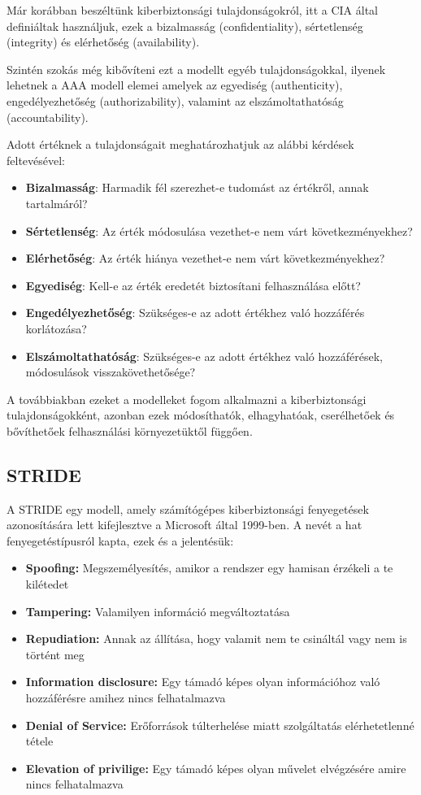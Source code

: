 Már korábban beszéltünk kiberbiztonsági tulajdonságokról, itt a CIA által definiáltak használjuk, ezek a bizalmasság (confidentiality), sértetlenség (integrity) és elérhetőség (availability). 

Szintén szokás még kibővíteni ezt a modellt egyéb tulajdonságokkal, ilyenek lehetnek a AAA modell elemei amelyek az egyediség (authenticity), engedélyezhetőség (authorizability), valamint az elszámoltathatóság (accountability).

Adott értéknek a tulajdonságait meghatározhatjuk az alábbi kérdések feltevésével:
\begin{itemize}
    \item \textbf{Bizalmasság}: Harmadik fél szerezhet-e tudomást az értékről, annak tartalmáról?
    \item \textbf{Sértetlenség}: Az érték módosulása vezethet-e nem várt következményekhez?
    \item \textbf{Elérhetőség}: Az érték hiánya vezethet-e nem várt következményekhez?
    \item \textbf{Egyediség}: Kell-e az érték eredetét biztosítani felhasználása előtt?
    \item \textbf{Engedélyezhetőség}: Szükséges-e az adott értékhez való hozzáférés korlátozása?
    \item \textbf{Elszámoltathatóság}: Szükséges-e az adott értékhez való hozzáférések, módosulások visszakövethetősége?
\end{itemize}

A továbbiakban ezeket a modelleket fogom alkalmazni a kiberbiztonsági tulajdonságokként, azonban ezek módosíthatók, elhagyhatóak, cserélhetőek és bővíthetőek felhasználási környezetüktől függően.

\subsection{STRIDE}
A STRIDE egy modell, amely számítógépes kiberbiztonsági fenyegetések azonosítására lett kifejlesztve a Microsoft által 1999-ben. A nevét a hat fenyegetéstípusról kapta, ezek és a jelentésük:

\begin{itemize}
    \item \textbf{Spoofing:} Megszemélyesítés, amikor a rendszer egy hamisan érzékeli a te kilétedet 
    \item \textbf{Tampering:} Valamilyen információ megváltoztatása
    \item \textbf{Repudiation:} Annak az állítása, hogy valamit nem te csináltál vagy nem is történt meg
    \item \textbf{Information disclosure:} Egy támadó képes olyan információhoz való hozzáférésre amihez nincs felhatalmazva
    \item \textbf{Denial of Service:} Erőforrások túlterhelése miatt szolgáltatás elérhetetlenné tétele
    \item \textbf{Elevation of privilige:} Egy támadó képes olyan művelet elvégzésére amire nincs felhatalmazva
\end{itemize}

